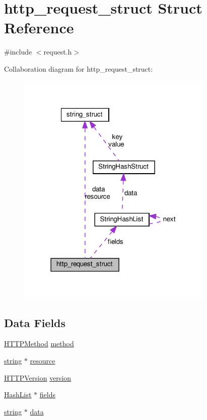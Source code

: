 \hypertarget{structhttp__request__struct}{}\section{http\+\_\+request\+\_\+struct Struct Reference}
\label{structhttp__request__struct}


{\ttfamily \#include $<$request.\+h$>$}



Collaboration diagram for http\+\_\+request\+\_\+struct\+:
\nopagebreak
\begin{figure}[H]
\begin{center}
\leavevmode
\includegraphics[width=266pt]{structhttp__request__struct__coll__graph}
\end{center}
\end{figure}
\subsection*{Data Fields}
\begin{DoxyCompactItemize}
\item 
\hyperlink{helpers_8h_a837a089a977b319a11edfb8022d9e47d}{H\+T\+T\+P\+Method} \hyperlink{structhttp__request__struct_a142613365447813080ed707830788a63}{method}
\item 
\hyperlink{string_8h_a3d2981d9da3e25dd89371059777fdd12}{string} $\ast$ \hyperlink{structhttp__request__struct_a09aa4e1a1b2609255ee841c0607d8bea}{resource}
\item 
\hyperlink{helpers_8h_abe818f5ff14e9c60c052a3e96877cec6}{H\+T\+T\+P\+Version} \hyperlink{structhttp__request__struct_ad3e7ead879a6e870226227ac79d73ec9}{version}
\item 
\hyperlink{hash_8h_a58bb615f9115c5b9b1a49a64d3737edf}{Hash\+List} $\ast$ \hyperlink{structhttp__request__struct_a640c838701b686459e80b063a9604a7c}{fields}
\item 
\hyperlink{string_8h_a3d2981d9da3e25dd89371059777fdd12}{string} $\ast$ \hyperlink{structhttp__request__struct_af9e4d83beef89b79bf9a9c0c7f00ddcc}{data}
\end{DoxyCompactItemize}


